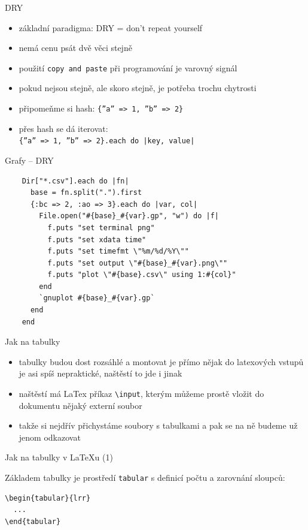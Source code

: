\documentclass{beamer}
\begin{document}
\begin{frame}[fragile]{DRY}
  \begin{itemize}
    \item základní paradigma: DRY = don't repeat yourself
    \item nemá cenu psát dvě věci stejně
    \item použití \texttt{copy and paste} při programování je varovný signál
    \item pokud nejsou stejně, ale skoro stejně, je potřeba trochu chytrosti
    \item připomeňme si hash: \texttt{\{''a'' => 1, ''b'' => 2\}}
    \item přes hash se dá iterovat: \\ \texttt{\{''a'' => 1, ''b'' => 2\}.each do |key, value|}
  \end{itemize}
\end{frame}

\begin{frame}[fragile]{Grafy -- DRY}
  \tiny
  \begin{verbatim}
    Dir["*.csv"].each do |fn|
      base = fn.split(".").first
      {:bc => 2, :ao => 3}.each do |var, col|
        File.open("#{base}_#{var}.gp", "w") do |f|
          f.puts "set terminal png"
          f.puts "set xdata time"
          f.puts "set timefmt \"%m/%d/%Y\""
          f.puts "set output \"#{base}_#{var}.png\""
          f.puts "plot \"#{base}.csv\" using 1:#{col}"
        end
        `gnuplot #{base}_#{var}.gp`
      end
    end
  \end{verbatim}
\end{frame}

\begin{frame}[fragile]{Jak na tabulky}
  \begin{itemize}
    \item tabulky budou dost rozsáhlé a montovat je přímo nějak do latexových vstupů je asi spíš nepraktické, naštěstí to jde i jinak
    \item naštěstí má LaTex příkaz \texttt{\textbackslash{}input}, kterým můžeme prostě vložit do dokumentu nějaký externí soubor
    \item takže si nejdřív přichystáme soubory s tabulkami a pak se na ně budeme už jenom odkazovat
  \end{itemize}
\end{frame}

\begin{frame}[fragile]{Jak na tabulky v LaTeXu (1)}
  \begin{block}{ }
    Základem tabulky je prostředí \texttt{tabular} s definicí počtu a zarovnání sloupců:
    \scriptsize
    \begin{verbatim}
\begin{tabular}{lrr}
  ...
\end{tabular}
    \end{verbatim}
  \end{block}
\end{frame}
\end{document}
